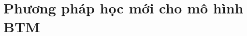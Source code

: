 \documentclass[pdf]{beamer}
\begin{document}

%

\section{Phương pháp học mới cho mô hình BTM}
\end{document}
